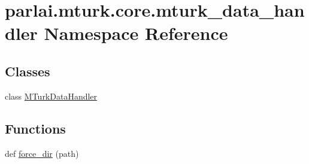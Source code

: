 \hypertarget{namespaceparlai_1_1mturk_1_1core_1_1mturk__data__handler}{}\section{parlai.\+mturk.\+core.\+mturk\+\_\+data\+\_\+handler Namespace Reference}
\label{namespaceparlai_1_1mturk_1_1core_1_1mturk__data__handler}
\subsection*{Classes}
\begin{DoxyCompactItemize}
\item 
class \hyperlink{classparlai_1_1mturk_1_1core_1_1mturk__data__handler_1_1MTurkDataHandler}{M\+Turk\+Data\+Handler}
\end{DoxyCompactItemize}
\subsection*{Functions}
\begin{DoxyCompactItemize}
\item 
def \hyperlink{namespaceparlai_1_1mturk_1_1core_1_1mturk__data__handler_a28ec50366a486cded72d95c9be461c2f}{force\+\_\+dir} (path)
\end{DoxyCompactItemize}
